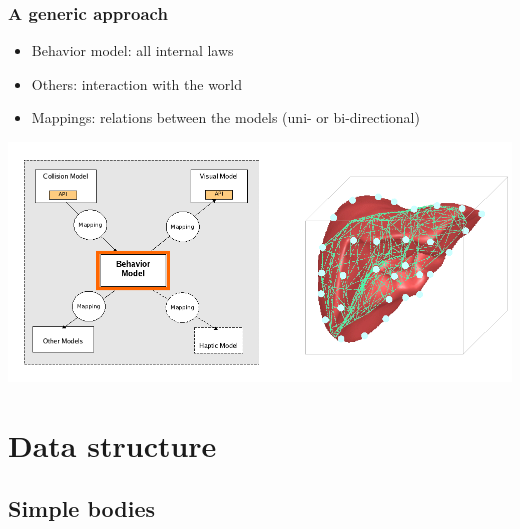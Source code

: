 \documentclass[a4paper,compress]{beamer}
\begin{document}
\begin{frame}
\frametitle{A generic approach}
\begin{itemize}
\item Behavior model: all internal laws
\item Others: interaction with the world
\item Mappings: relations between the models (uni- or bi-directional)
\end{itemize}
\begin{center}
 \includegraphics[width=\linewidth]{multimodal.png}
\end{center}

\end{frame}



\section{Data structure}
\subsection{Simple bodies}
\end{document}
